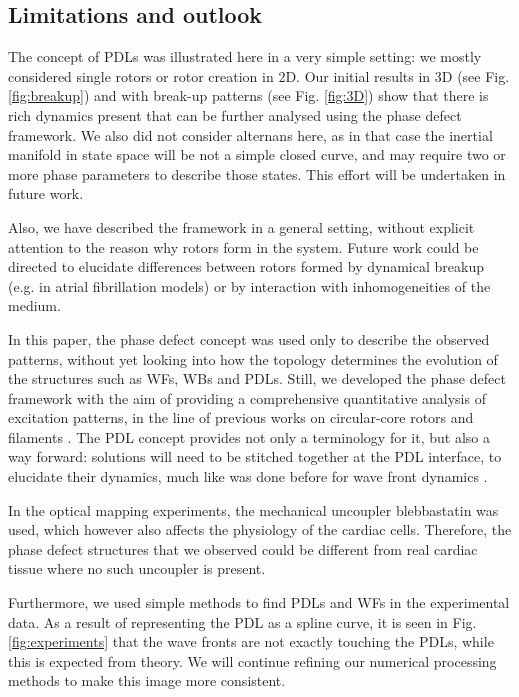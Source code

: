 \documentclass{article}
\begin{document}
\subsection{Limitations and outlook}

The concept of PDLs was illustrated here in a very simple setting: we mostly considered single rotors or rotor creation in 2D. Our initial results in 3D (see Fig. \ref{fig:breakup}) and with break-up patterns (see Fig. \ref{fig:3D}) show that there is rich dynamics present that can be further analysed using the phase defect framework. We also did not consider alternans here, as in that case the inertial manifold in state space will be not a simple closed curve, and may require two or more phase parameters to describe those states. This effort will be undertaken in future work. 

Also, we have described the framework in a general setting, without explicit attention to the reason why rotors form in the system. Future work could be directed to elucidate differences between rotors formed by dynamical breakup (e.g. in atrial fibrillation models) or by interaction with inhomogeneities of the medium. 

In this paper, the phase defect concept was used only to describe the observed patterns, without yet looking into how the topology determines the evolution of the structures such as WFs, WBs and PDLs. Still, we developed the phase defect framework with the aim of providing a comprehensive quantitative analysis of excitation patterns, in the line of previous works on circular-core rotors and filaments \citep{Keener:1988,Wellner:2002,Verschelde:2007,Dierckx:2012}. The PDL concept provides not only a terminology for it, but also a way forward: solutions will need to be stitched together at the PDL interface, to elucidate their dynamics, much like was done before for wave front dynamics \citep{Keener:1986}. 

In the optical mapping experiments, the mechanical uncoupler blebbastatin was used, which however also affects the physiology of the cardiac cells. Therefore, the phase defect structures that we observed could be different from real cardiac tissue where no such uncoupler is present. 

Furthermore, we used simple methods to find PDLs and WFs in the experimental data. As a result of representing the PDL as a spline curve, it is seen in Fig. \ref{fig:experiments} that the wave fronts are not exactly touching the PDLs, while this is expected from theory. We will continue refining our numerical processing methods to make this image more consistent. 
\end{document}
